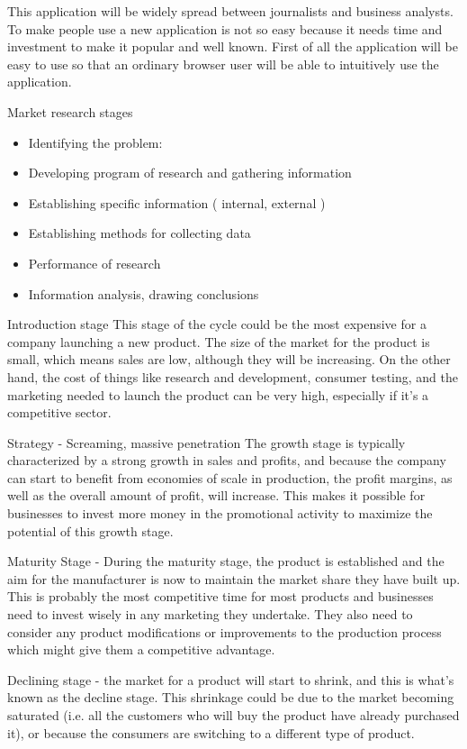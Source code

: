 This application will be widely spread between journalists and business analysts. To make people use a new application is not so easy because it needs time and investment to make it popular and well known. First of all the application will be easy to use so that an ordinary browser user will be able to intuitively use the application.

Market research stages
\begin{itemize}
 \item Identifying the problem:
 \item Developing program of research and gathering
information
 \item Establishing specific information ( internal, external )
 \item Establishing methods for collecting data
 \item Performance of research
 \item Information analysis, drawing conclusions
\end{itemize}

Introduction stage This stage of the cycle could be the most expensive for a company launching a new product. The size of the market for the product is small, which means sales are low, although they will be increasing. On the other hand, the cost of things like research and development, consumer testing, and the marketing needed to launch the product can be very high, especially if it's a competitive sector.

Strategy - Screaming, massive penetration The growth stage is typically characterized by a strong growth in sales and profits, and because the company can start to benefit from economies of scale in production, the profit margins, as well as the overall amount of profit, will increase. This makes it possible for businesses to invest more money in the promotional activity to maximize the potential of this growth stage.

Maturity Stage - During the maturity stage, the product is established and the aim for the manufacturer is now to maintain the market share they have built up. This is probably the most competitive time for most products and businesses need to invest wisely in any marketing they undertake. They also need to consider any product modifications or improvements to the production process which might give them a competitive advantage.

Declining stage - the market for a product will start to shrink, and this is what's known as the decline stage. This shrinkage could be due to the market becoming saturated (i.e. all the customers who will buy the product have already purchased it), or because the consumers are switching to a different type of product.



